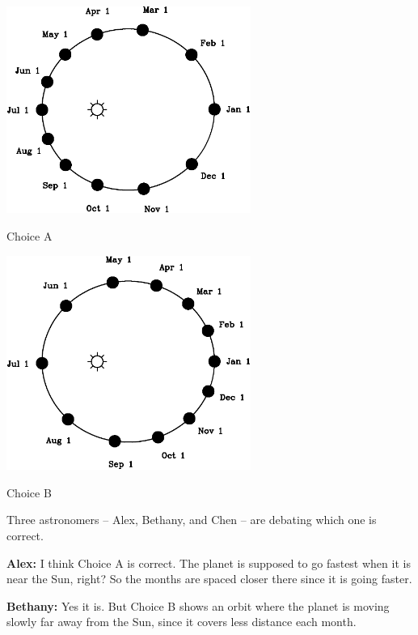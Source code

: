 \documentclass[12pt]{article}
\begin{document}
\bigskip

\begin{minipage}{0.5\textwidth}
	\begin{center}
		\includegraphics[width=0.6\textwidth]{choice2-crop.pdf}
		
		Choice A
	\end{center}
\end{minipage}
\begin{minipage}{0.5\textwidth}
	\begin{center}
		\includegraphics[width=0.6\textwidth]{choice1-crop.pdf}
		
		Choice B
	\end{center}
\end{minipage}


Three astronomers -- Alex, Bethany, and Chen -- are debating which one is correct.


{\bf Alex:} I think Choice A is correct. The planet is supposed to go fastest when it is near the Sun, right? So the months are spaced closer there since it is going faster.

{\bf Bethany:} Yes it is. But Choice B shows an orbit where the planet is moving slowly far away from the Sun, since it covers less distance each month.
\end{document}
